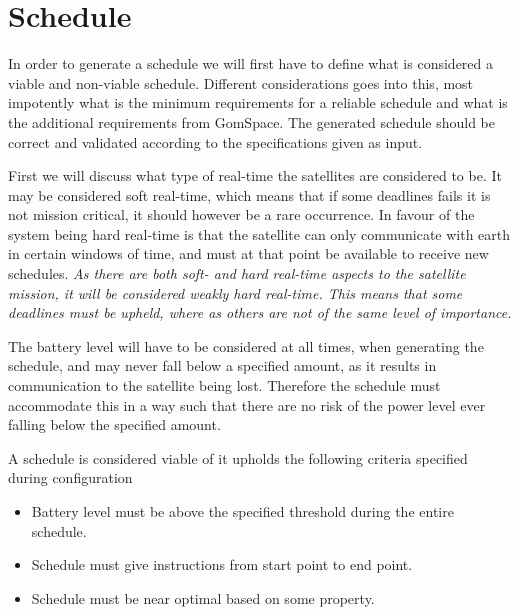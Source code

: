 \section{Schedule}
In order to generate a schedule we will first have to define what is considered a viable and non-viable schedule. Different considerations goes into this, most impotently what is the minimum requirements for a reliable schedule and what is the additional requirements from GomSpace. The generated schedule should be correct and validated according to the specifications given as input. 

First we will discuss what type of real-time the satellites are considered to be. It may be considered soft real-time, which means that if some deadlines fails it is not mission critical, it should however be a rare occurrence. In favour of the system being hard real-time is that the satellite can only communicate with earth in certain windows of time, and must at that point be available to receive new schedules. \textit{As there are both soft- and hard real-time aspects to the satellite mission, it will be considered weakly hard real-time. This means that some deadlines must be upheld, where as others are not of the same level of importance.}

The battery level will have to be considered at all times, when generating the schedule, and may never fall below a specified amount, as it results in communication to the satellite being lost.
Therefore the schedule must accommodate this in a way such that there are no risk of the power level ever falling below the specified amount. 

A schedule is considered viable of it upholds the following criteria specified during configuration 
\begin{itemize}
	\item Battery level must be above the specified threshold during the entire schedule.
	\item Schedule must give instructions from start point to end point.
	\item Schedule must be near optimal based on some property.
\end{itemize}


